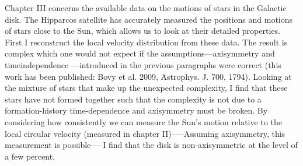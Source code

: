 Chapter III concerns the available data on the motions of stars in the
Galactic disk. The Hipparcos satellite has accurately measured the
positions and motions of stars close to the Sun, which allows us to
look at their detailed properties. First I reconstruct the local
velocity distribution from these data. The result is complex which one
would not expect if the assumptions—axisymmetry and timeindependence
—introduced in the previous paragraphs were correct (this work has
been published: Bovy et al. 2009, Astrophys. J. 700, 1794). Looking at
the mixture of stars that make up the unexpected complexity, I find
that these stars have not formed together such that the complexity is
not due to a formation-history time-dependence and axisymmetry must be
broken. By considering how consistently we can measure the Sun’s
motion relative to the local circular velocity (measured in chapter
II)—--Assuming axisymmetry, this measurement is possible—--I find that
the disk is non-axisymmetric at the level of a few percent.
